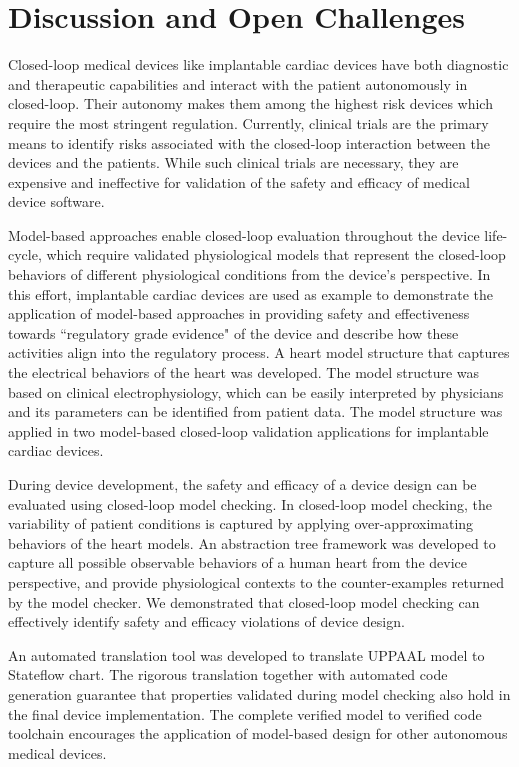 \chapter{Discussion and Open Challenges}
Closed-loop medical devices like implantable cardiac devices have both diagnostic and therapeutic capabilities and interact with the patient autonomously in closed-loop. Their autonomy makes them among the highest risk devices which require the most stringent regulation. Currently, clinical trials are the primary means to identify risks associated with the closed-loop interaction between the devices and the patients. While such clinical trials are necessary, they are expensive and ineffective for validation of the safety and efficacy of medical device software. 

Model-based approaches enable closed-loop evaluation throughout the device life-cycle, which require validated physiological models that represent the closed-loop behaviors of different physiological conditions from the device's perspective. 
In this effort, implantable cardiac devices are used as example to demonstrate the application of model-based approaches in providing safety and effectiveness towards ``regulatory grade evidence" of the device and describe how these activities align into the regulatory process. 
A heart model structure that captures the electrical behaviors of the heart was developed.
The model structure was based on clinical electrophysiology, which can be easily interpreted by physicians and its parameters can be identified from patient data.
The model structure was applied in two model-based closed-loop validation applications for implantable cardiac devices.

During device development, the safety and efficacy of a device design can be evaluated using closed-loop model checking.
In closed-loop model checking, the variability of patient conditions is captured by applying over-approximating behaviors of the heart models.
An abstraction tree framework was developed to capture all possible observable behaviors of a human heart from the device perspective, and provide physiological contexts to the counter-examples returned by the model checker.
We demonstrated that closed-loop model checking can effectively identify safety and efficacy violations of device design.

An automated translation tool was developed to translate UPPAAL model to Stateflow chart. 
The rigorous translation together with automated code generation guarantee that properties validated during model checking also hold in the final device implementation.
The complete verified model to verified code toolchain encourages the application of model-based design for other autonomous medical devices.

